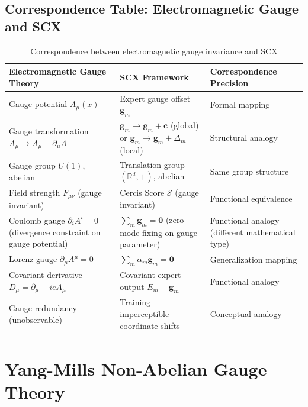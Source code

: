 \documentclass[12pt,a4paper]{article}
\theoremstyle{remark}
\newcommand{\R}{\mathbb{R}}
\newcommand{\CercisScore}{\mathcal{S}}
\newcommand{\gaugeparam}{\mathbf{g}}
\begin{document}
\subsection{Correspondence Table: Electromagnetic Gauge and SCX}

\begin{table}[H]
\centering
\caption{Correspondence between electromagnetic gauge invariance and SCX}
\label{tab:em_correspondence}
\begin{tabular}{p{4.5cm} p{4.5cm} p{4.5cm}}
\toprule
\textbf{Electromagnetic Gauge Theory} & \textbf{SCX Framework} & \textbf{Correspondence Precision} \\
\midrule
Gauge potential $A_\mu(x)$ & Expert gauge offset $\gaugeparam_m$ & Formal mapping \\
Gauge transformation $A_\mu \to A_\mu + \partial_\mu\Lambda$ & $\gaugeparam_m \to \gaugeparam_m + \mathbf{c}$ (global) or $\gaugeparam_m \to \gaugeparam_m + \Delta_m$ (local) & Structural analogy \\
Gauge group $U(1)$, abelian & Translation group $(\R^d, +)$, abelian & Same group structure \\
Field strength $F_{\mu\nu}$ (gauge invariant) & Cercis Score $\CercisScore$ (gauge invariant) & Functional equivalence \\
Coulomb gauge $\partial_i A^i = 0$ (divergence constraint on gauge potential) & $\sum_m \gaugeparam_m = \mathbf{0}$ (zero-mode fixing on gauge parameter) & Functional analogy (different mathematical type) \\
Lorenz gauge $\partial_\mu A^\mu = 0$ & $\sum_m \alpha_m \gaugeparam_m = \mathbf{0}$ & Generalization mapping \\
Covariant derivative $D_\mu = \partial_\mu + i e A_\mu$ & Covariant expert output $E_m - \gaugeparam_m$ & Functional analogy \\
Gauge redundancy (unobservable) & Training-imperceptible coordinate shifts & Conceptual analogy \\
\bottomrule
\end{tabular}
\end{table}

\newpage

\section{Yang-Mills Non-Abelian Gauge Theory}
\end{document}
